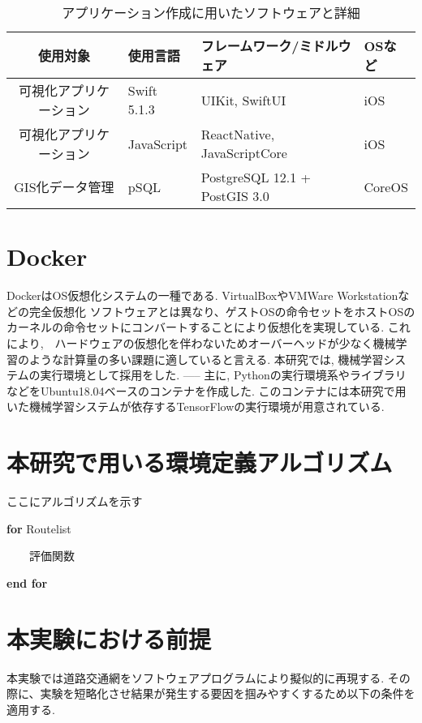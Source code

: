\begin{table}[h]
  \caption{アプリケーション作成に用いたソフトウェアと詳細}
  \label{table:SpeedOfLight}
  \centering
  \begin{tabular}{clll}
    \hline
      使用対象 & 使用言語 & フレームワーク/ミドルウェア & OSなど \\
      \hline \hline
      可視化アプリケーション & Swift 5.1.3 & UIKit, SwiftUI & iOS \\
      可視化アプリケーション & JavaScript & ReactNative, JavaScriptCore & iOS \\
      GIS化データ管理 & pSQL & PostgreSQL 12.1 + PostGIS 3.0 & CoreOS \\
    \hline
  \end{tabular}
\end{table}


\section{Docker}

DockerはOS仮想化システムの一種である. VirtualBoxやVMWare Workstationなどの完全仮想化
ソフトウェアとは異なり、ゲストOSの命令セットをホストOSのカーネルの命令セットにコンバートすることにより仮想化を実現している.
これにより,　ハードウェアの仮想化を伴わないためオーバーヘッドが少なく機械学習のような計算量の多い課題に適していると言える.
本研究では, 機械学習システムの実行環境として採用をした.
-----
主に, Pythonの実行環境系やライブラリなどをUbuntu18.04ベースのコンテナを作成した.
このコンテナには本研究で用いた機械学習システムが依存するTensorFlowの実行環境が用意されている.

\section{本研究で用いる環境定義アルゴリズム}

ここにアルゴリズムを示す

\textbf{for} Routelist

\ \ \ \ 評価関数

\textbf{end for}


\section{本実験における前提}

本実験では道路交通網をソフトウェアプログラムにより擬似的に再現する. その際に、実験を短略化させ結果が発生する要因を掴みやすくするため以下の条件を適用する.


